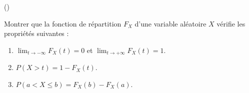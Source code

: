 \begin{exercice}\label{exo4-3} (\minsyndical)

Montrer que la fonction de r\'epartition $F_X$ d'une variable al\'eatoire $X$ 
v\'erifie les propri\'et\'es suivantes : 

\begin{enumerate}

\item $\lim_{t \rightarrow -\infty} F_X(t) = 0$ et $\lim_{t \rightarrow +\infty} F_X(t) = 1$.

\item $P(X > t) = 1 - F_X(t)$.

\item $P(a < X \leq b) = F_X(b) - F_X(a)$.\\

\end{enumerate}


\end{exercice}
